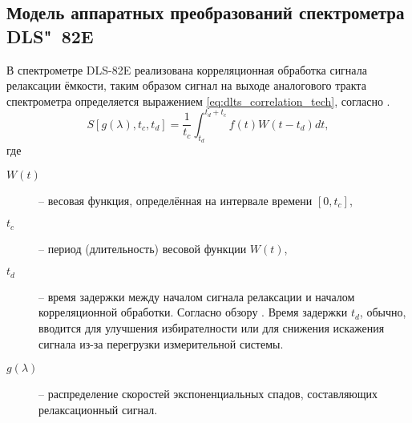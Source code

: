    \subsection{Модель аппаратных преобразований спектрометра DLS"~82E}

    В спектрометре DLS-82E реализована корреляционная обработка сигнала
    релаксации ёмкости, таким образом сигнал на выходе аналогового тракта
    спектрометра определяется выражением \ref{eq:dlts_correlation_tech},
    согласно \cite{istratov_exp_analysis}.
    \begin{equation}
        \label{eq:dlts_correlation_tech}
        S\left[g(\lambda),t_c,t_d\right]=\frac{1}{t_c}\int_{t_d}^{t_d+t_c}
        f(t)W\left(t-t_d\right)dt ,
    \end{equation}
    где
    \begin{description}
        \item[$W(t)$] -- весовая функция, определённая на интервале 
        времени $\left[0,t_c\right]$,
        \item[$t_c$] -- период (длительность) весовой функции $W(t)$,
        \item[$t_d$] -- время задержки между началом сигнала релаксации
        и началом корреляционной обработки. Согласно обзору 
        \cite{istratov_exp_analysis}. Время задержки $t_d$, обычно, 
        вводится для улучшения избирателности или для снижения искажения
        сигнала из-за перегрузки измерительной системы.
        \item[$g(\lambda)$] -- распределение скоростей экспоненциальных
        спадов, составляющих релаксационный сигнал.
    \end{description}

